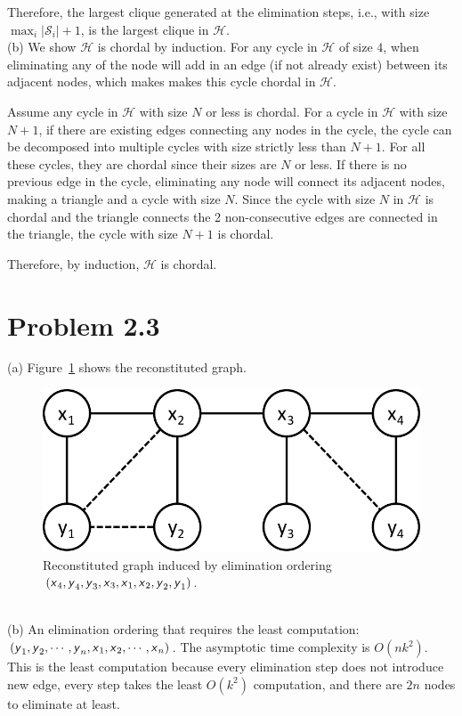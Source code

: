 \documentclass{article}
\newcommand{\s}[1]{\textsf{\textit{#1}}}
\newcommand{\qeds}{\hfill\qedsymbol}
\begin{document}
Therefore, the largest clique generated at the elimination steps, i.e., with size $\max_i |\mathscr{S}_i| +1$,
is the largest clique in $\mathscr{H}$. \qeds
\\

%
\noindent
(b) We show $\mathscr{H}$ is chordal by induction.
%
For any cycle in $\mathscr{H}$ of size $4$, when eliminating any of the node will add in an edge (if not already
exist) between its adjacent nodes, which makes makes this cycle chordal in $\mathscr{H}$.

%
Assume any cycle in $\mathscr{H}$ with size $N$ or less is chordal. For a cycle in $\mathscr{H}$ with size $N+1$,
if there are existing edges connecting any nodes in the cycle, the cycle can be decomposed into multiple cycles
with size strictly less than $N+1$. For all these cycles, they are chordal since their sizes are $N$ or less. If
there is no previous edge in the cycle, eliminating any node will connect its adjacent nodes, making a triangle
and a cycle with size $N$. Since the cycle with size $N$ in $\mathscr{H}$ is chordal and the triangle connects
the 2 non-consecutive edges are connected in the triangle, the cycle with size $N+1$ is chordal. 

%
Therefore, by induction, $\mathscr{H}$ is chordal. \qeds

\pagebreak

\section*{Problem 2.3}
(a) Figure~\ref{f:3a} shows the reconstituted graph.
%
\begin{figure}[h]
  \centering
  \includegraphics[width=0.5\columnwidth]{3a.pdf}
  \vspace{-0.2cm}
  \caption{Reconstituted graph induced by elimination ordering $(\s{x}_4,\s{y}_4,\s{y}_3,\s{x}_3,\s{x}_1,\s{x}_2,\s{y}_2,\s{y}_1)$.}
  \label{f:3a}
\end{figure}
%
\\

%
\noindent
(b) An elimination ordering that requires the least computation:
$(\s{y}_1, \s{y}_2, \cdots, \s{y}_n, \s{x}_1, \s{x}_2, \cdots, \s{x}_n)$.
%
The asymptotic time complexity is $O(nk^2)$.
%
This is the least computation because every elimination step does not introduce new edge, every step takes
the least $O(k^2)$ computation, and there are $2n$ nodes to eliminate at least.
\end{document}
